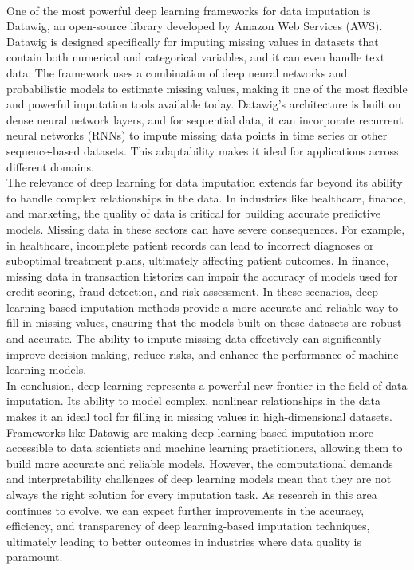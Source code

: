 \documentclass{article}
\begin{document}
\\
One of the most powerful deep learning frameworks for data imputation is Datawig, an open-source library developed by Amazon Web Services (AWS). Datawig is designed specifically for imputing missing values in datasets that contain both numerical and categorical variables, and it can even handle text data. The framework uses a combination of deep neural networks and probabilistic models to estimate missing values, making it one of the most flexible and powerful imputation tools available today. Datawig’s architecture is built on dense neural network layers, and for sequential data, it can incorporate recurrent neural networks (RNNs) to impute missing data points in time series or other sequence-based datasets. This adaptability makes it ideal for applications across different domains.
\\
The relevance of deep learning for data imputation extends far beyond its ability to handle complex relationships in the data. In industries like healthcare, finance, and marketing, the quality of data is critical for building accurate predictive models. Missing data in these sectors can have severe consequences. For example, in healthcare, incomplete patient records can lead to incorrect diagnoses or suboptimal treatment plans, ultimately affecting patient outcomes. In finance, missing data in transaction histories can impair the accuracy of models used for credit scoring, fraud detection, and risk assessment. In these scenarios, deep learning-based imputation methods provide a more accurate and reliable way to fill in missing values, ensuring that the models built on these datasets are robust and accurate. The ability to impute missing data effectively can significantly improve decision-making, reduce risks, and enhance the performance of machine learning models.
\\
In conclusion, deep learning represents a powerful new frontier in the field of data imputation. Its ability to model complex, nonlinear relationships in the data makes it an ideal tool for filling in missing values in high-dimensional datasets. Frameworks like Datawig are making deep learning-based imputation more accessible to data scientists and machine learning practitioners, allowing them to build more accurate and reliable models. However, the computational demands and interpretability challenges of deep learning models mean that they are not always the right solution for every imputation task. As research in this area continues to evolve, we can expect further improvements in the accuracy, efficiency, and transparency of deep learning-based imputation techniques, ultimately leading to better outcomes in industries where data quality is paramount.
\pagebreak
\end{document}
